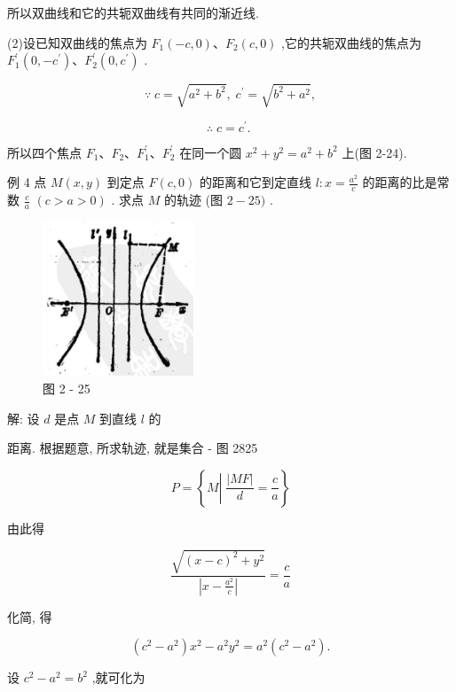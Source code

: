 \documentclass[lang=cn,newtx,10pt,scheme=chinese]{elegantbook}
\begin{document}
所以双曲线和它的共轭双曲线有共同的渐近线.

(2)设已知双曲线的焦点为 \({F}_{1}\left( {-c,0}\right) \text{、}{F}_{2}\left( {c,0}\right)\) ,它的共轭双曲线的焦点为 \({F}_{1}^{\prime }\left( {0, - {c}^{\prime }}\right) \text{、}{F}_{2}^{\prime }\left( {0,{c}^{\prime }}\right)\) .

\[
  \because \;c = \sqrt{{a}^{2} + {b}^{2}},\;{c}^{\prime } = \sqrt{{b}^{2} + {a}^{2}},
\]

\[
  \therefore \;c = {c}^{\prime }\text{. }
\]

所以四个焦点 \({F}_{1}\text{、}{F}_{2}\text{、}{F}_{1}^{\prime }\text{、}{F}_{2}^{\prime }\) 在同一个圆 \({x}^{2} + {y}^{2} = {a}^{2} + {b}^{2}\) 上(图 2-24).

例 4 点 \(M\left( {x,y}\right)\) 到定点 \(F\left( {c,0}\right)\) 的距离和它到定直线 \(l : x = \frac{{a}^{2}}{c}\) 的距离的比是常数 \(\frac{c}{a}\) \(\left( {c > a > 0}\right)\) . 求点 \(M\) 的轨迹 (图 \(2 - {25})\) .

\begin{figure}[h]
  \centering
  \includegraphics[max width=0.4\textwidth]{images/01912cc2-ffb6-728e-9ae7-b113ff05c64b_104_910731.jpg}
  \caption{图 2 - 25}
\end{figure}

解: 设 \(d\) 是点 \(M\) 到直线 \(l\) 的

距离. 根据题意, 所求轨迹, 就是集合 - 图 2825

\[
  P = \left\{ {M\left| {\;\frac{\left| MF\right| }{d} = \frac{c}{a}}\right. }\right\}
\]

由此得

\[
  \frac{\sqrt{{\left( x - c\right) }^{2} + {y}^{2}}}{\left| x - \frac{{a}^{2}}{c}\right| } = \frac{c}{a}
\]

化简, 得

\[
  \left( {{c}^{2} - {a}^{2}}\right) {x}^{2} - {a}^{2}{y}^{2} = {a}^{2}\left( {{c}^{2} - {a}^{2}}\right) .
\]

设 \({c}^{2} - {a}^{2} = {b}^{2}\) ,就可化为
\end{document}
